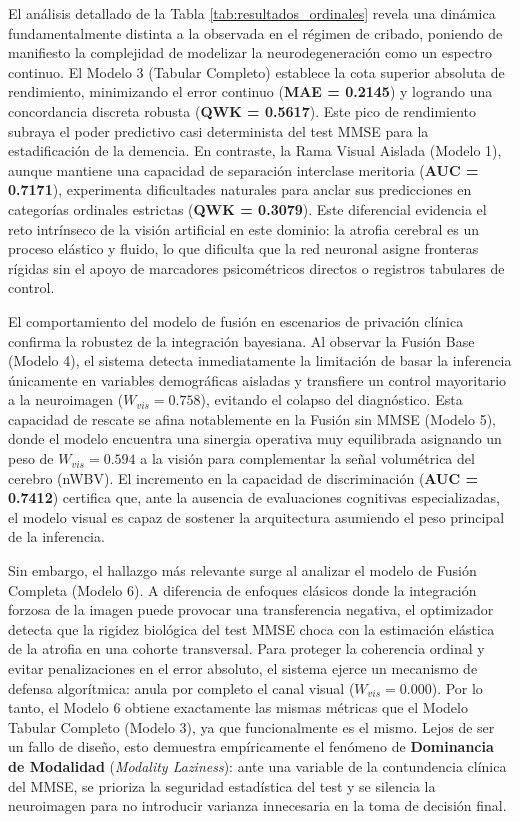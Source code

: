 \documentclass[12pt, oneside, english, spanish]{book}
\begin{document}
El análisis detallado de la Tabla \ref{tab:resultados_ordinales} revela una dinámica fundamentalmente distinta a la observada en el régimen de cribado, poniendo de manifiesto la complejidad de modelizar la neurodegeneración como un espectro continuo. El Modelo 3 (Tabular Completo) establece la cota superior absoluta de rendimiento, minimizando el error continuo (\textbf{MAE = 0.2145}) y logrando una concordancia discreta robusta (\textbf{QWK = 0.5617}). Este pico de rendimiento subraya el poder predictivo casi determinista del test MMSE para la estadificación de la demencia. En contraste, la Rama Visual Aislada (Modelo 1), aunque mantiene una capacidad de separación interclase meritoria (\textbf{AUC = 0.7171}), experimenta dificultades naturales para anclar sus predicciones en categorías ordinales estrictas (\textbf{QWK = 0.3079}). Este diferencial evidencia el reto intrínseco de la visión artificial en este dominio: la atrofia cerebral es un proceso elástico y fluido, lo que dificulta que la red neuronal asigne fronteras rígidas sin el apoyo de marcadores psicométricos directos o registros tabulares de control.

El comportamiento del modelo de fusión en escenarios de privación clínica confirma la robustez de la integración bayesiana. Al observar la Fusión Base (Modelo 4), el sistema detecta inmediatamente la limitación de basar la inferencia únicamente en variables demográficas aisladas y transfiere un control mayoritario a la neuroimagen ($W_{vis} = 0.758$), evitando el colapso del diagnóstico. Esta capacidad de rescate se afina notablemente en la Fusión sin MMSE (Modelo 5), donde el modelo encuentra una sinergia operativa muy equilibrada asignando un peso de $W_{vis} = 0.594$ a la visión para complementar la señal volumétrica del cerebro (nWBV). El incremento en la capacidad de discriminación (\textbf{AUC = 0.7412}) certifica que, ante la ausencia de evaluaciones cognitivas especializadas, el modelo visual es capaz de sostener la arquitectura asumiendo el peso principal de la inferencia.

Sin embargo, el hallazgo más relevante surge al analizar el modelo de Fusión Completa (Modelo 6). A diferencia de enfoques clásicos donde la integración forzosa de la imagen puede provocar una transferencia negativa, el optimizador detecta que la rigidez biológica del test MMSE choca con la estimación elástica de la atrofia en una cohorte transversal. Para proteger la coherencia ordinal y evitar penalizaciones en el error absoluto, el sistema ejerce un mecanismo de defensa algorítmica: anula por completo el canal visual ($W_{vis} = 0.000$). Por lo tanto, el Modelo 6 obtiene exactamente las mismas métricas que el Modelo Tabular Completo (Modelo 3), ya que funcionalmente es el mismo. Lejos de ser un fallo de diseño, esto demuestra empíricamente el fenómeno de \textbf{Dominancia de Modalidad} (\textit{Modality Laziness}): ante una variable de la contundencia clínica del MMSE, se prioriza la seguridad estadística del test y se silencia la neuroimagen para no introducir varianza innecesaria en la toma de decisión final.
\end{document}
